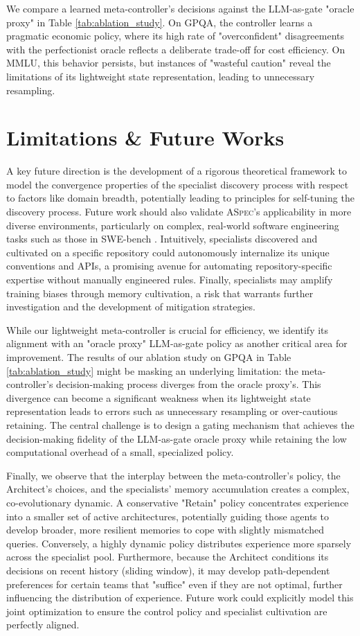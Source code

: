\documentclass{article} %
\begin{document}
We compare a learned meta-controller's decisions against the LLM-as-gate "oracle proxy" in Table \ref{tab:ablation_study}. On GPQA, the controller learns a pragmatic economic policy, where its high rate of "overconfident" disagreements with the perfectionist oracle reflects a deliberate trade-off for cost efficiency. On MMLU, this behavior persists, but instances of "wasteful caution" reveal the limitations of its lightweight state representation, leading to unnecessary resampling. 


\section{Limitations \& Future Works}
\label{future}
A key future direction is the development of a rigorous theoretical framework to model the convergence properties of the specialist discovery process with respect to factors like domain breadth, potentially leading to principles for self-tuning the discovery process. Future work should also validate \textsc{ASpec}'s applicability in more diverse environments, particularly on complex, real-world software engineering tasks such as those in SWE-bench \citep{jimenez2023swe}. Intuitively, specialists discovered and cultivated on a specific repository could autonomously internalize its unique conventions and APIs, a promising avenue for automating repository-specific expertise without manually engineered rules. Finally, specialists may amplify training biases through memory cultivation, a risk that warrants further investigation and the development of mitigation strategies.

While our lightweight meta-controller is crucial for efficiency, we identify its alignment with an "oracle proxy" LLM-as-gate policy as another critical area for improvement. The results of our ablation study on GPQA in Table \ref{tab:ablation_study} might be masking an underlying limitation: the meta-controller's decision-making process diverges from the oracle proxy's. This divergence can become a significant weakness when its lightweight state representation leads to errors such as unnecessary resampling or over-cautious retaining. The central challenge is to design a gating mechanism that achieves the decision-making fidelity of the LLM-as-gate oracle proxy while retaining the low computational overhead of a small, specialized policy.

Finally, we observe that the interplay between the meta-controller’s policy, the Architect’s choices, and the specialists’ memory accumulation creates a complex, co-evolutionary dynamic. A conservative "Retain" policy concentrates experience into a smaller set of active architectures, potentially guiding those agents to develop broader, more resilient memories to cope with slightly mismatched queries. Conversely, a highly dynamic policy distributes experience more sparsely across the specialist pool. Furthermore, because the Architect conditions its decisions on recent history (sliding window), it may develop path-dependent preferences for certain teams that "suffice" even if they are not optimal, further influencing the distribution of experience. Future work could explicitly model this joint optimization to ensure the control policy and specialist cultivation are perfectly aligned. 
\end{document}

